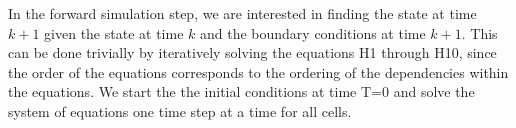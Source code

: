 

In the forward simulation step, we are interested in finding the state at time $k+1$ given the state at time $k$ and the boundary conditions at time $k+1$. This can be done trivially by iteratively solving the equations H1 through H10, since the order of the equations corresponds to the ordering of the dependencies within the equations.  We start the the initial conditions at time T=0 and solve the system of equations one time step at a time for all cells. 
